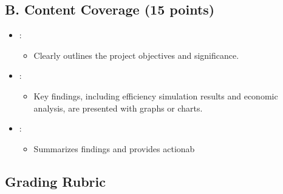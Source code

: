 \documentclass[letterpaper,10pt,english]{jupyterBook}
\begin{document}
\subsection{B. Content Coverage (15 points)}
\label{\detokenize{ProjectSyllabus:b-content-coverage-15-points}}\begin{itemize}
\item {} 
\sphinxAtStartPar
{}:
\begin{itemize}
\item {} 
\sphinxAtStartPar
Clearly outlines the project objectives and significance.

\end{itemize}

\item {} 
\sphinxAtStartPar
{}:
\begin{itemize}
\item {} 
\sphinxAtStartPar
Key findings, including efficiency simulation results and
economic analysis, are presented with graphs or charts.

\end{itemize}

\item {} 
\sphinxAtStartPar
{}:
\begin{itemize}
\item {} 
\sphinxAtStartPar
Summarizes findings and provides actionab

\end{itemize}

\end{itemize}


\subsection{Grading Rubric}
\label{\detokenize{ProjectSyllabus:grading-rubric}}
\end{document}
